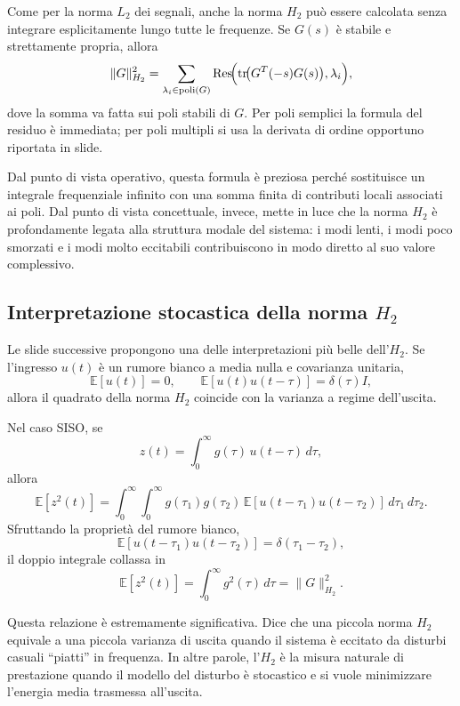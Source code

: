 \documentclass[11pt,a4paper]{article}
\begin{document}
Come per la norma $L_2$ dei segnali, anche la norma $H_2$ pu\`o essere calcolata senza integrare esplicitamente lungo tutte le frequenze. Se $G(s)$ \`e stabile e strettamente propria, allora
$$
\|G\|_{H_2}^2
=
\sum_{\lambda_i\in\mathrm{poli}(G)}
\operatorname{Res}\!\Bigl(\operatorname{tr}\!\bigl(G^T(-s)G(s)\bigr),\lambda_i\Bigr),
$$
dove la somma va fatta sui poli stabili di $G$. Per poli semplici la formula del residuo \`e immediata; per poli multipli si usa la derivata di ordine opportuno riportata in slide.

Dal punto di vista operativo, questa formula \`e preziosa perch\'e sostituisce un integrale frequenziale infinito con una somma finita di contributi locali associati ai poli. Dal punto di vista concettuale, invece, mette in luce che la norma $H_2$ \`e profondamente legata alla struttura modale del sistema: i modi lenti, i modi poco smorzati e i modi molto eccitabili contribuiscono in modo diretto al suo valore complessivo.

\subsection{Interpretazione stocastica della norma \texorpdfstring{$H_2$}{H2}}

Le slide successive propongono una delle interpretazioni pi\`u belle dell'$H_2$. Se l'ingresso $u(t)$ \`e un rumore bianco a media nulla e covarianza unitaria,
$$
\mathbb{E}[u(t)] = 0,
\qquad
\mathbb{E}[u(t)u(t-\tau)] = \delta(\tau)I,
$$
allora il quadrato della norma $H_2$ coincide con la varianza a regime dell'uscita.

Nel caso SISO, se
$$
z(t)=\int_0^\infty g(\tau)\,u(t-\tau)\,d\tau,
$$
allora
$$
\mathbb{E}[z^2(t)]
=
\int_0^\infty\int_0^\infty
g(\tau_1)g(\tau_2)\,
\mathbb{E}[u(t-\tau_1)u(t-\tau_2)]\,
d\tau_1\,d\tau_2.
$$
Sfruttando la propriet\`a del rumore bianco,
$$
\mathbb{E}[u(t-\tau_1)u(t-\tau_2)] = \delta(\tau_1-\tau_2),
$$
il doppio integrale collassa in
$$
\mathbb{E}[z^2(t)]
=
\int_0^\infty g^2(\tau)\,d\tau
=
\|G\|_{H_2}^2.
$$

Questa relazione \`e estremamente significativa. Dice che una piccola norma $H_2$ equivale a una piccola varianza di uscita quando il sistema \`e eccitato da disturbi casuali ``piatti'' in frequenza. In altre parole, l'$H_2$ \`e la misura naturale di prestazione quando il modello del disturbo \`e stocastico e si vuole minimizzare l'energia media trasmessa all'uscita.
\end{document}
